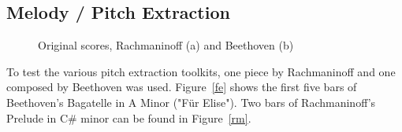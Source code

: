 \subsection{Melody / Pitch Extraction}\label{midiest}
\begin{figure}[htbp]
	\centering
	\caption{Original scores, Rachmaninoff (a) and Beethoven (b)}
	\label{fig:sheets}
\end{figure}
\FloatBarrier
\noindent To test the various pitch extraction toolkits, one piece by Rachmaninoff and one composed by Beethoven was used. Figure~\ref{fe} shows the first five bars of Beethoven's Bagatelle in A Minor ("Für Elise"). Two bars of Rachmaninoff's Prelude in C\# minor can be found in Figure~\ref{rm}. 
